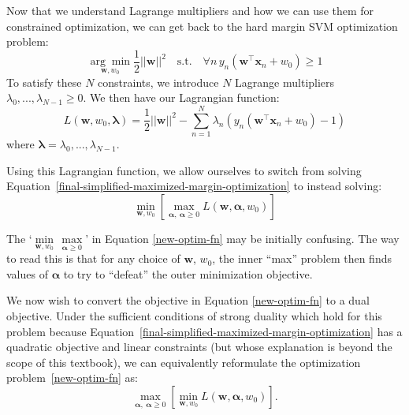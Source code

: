 Now that we understand Lagrange multipliers and how we can use them for constrained optimization, we can get back to the hard margin SVM optimization problem:
\begin{equation} \label{original-optim-fn}
	\underset{\textbf{w}, w_{0}}{\arg\min} \frac{1}{2} ||\textbf{w}||^{2} \quad \text{s.t.} \quad \forall n \, y_{n}(\textbf{w}^\top\textbf{x}_{n} + w_{0}) \geq 1
\end{equation}
To satisfy these $N$ constraints, we introduce $N$ Lagrange multipliers $\lambda_{0}, ..., \lambda_{N-1} \geq 0$. We then have our Lagrangian function:
\begin{equation} \label{lagrange-equation}
	L(\textbf{w}, w_{0}, \boldsymbol{\lambda}) = \frac{1}{2} ||\textbf{w}||^{2} - \sum_{n=1}^{N} \lambda_{n} (y_{n}(\textbf{w}^\top \textbf{x}_{n} + w_{0}) - 1)
\end{equation}
where $\boldsymbol{\lambda} = \lambda_{0}, ..., \lambda_{N-1}$.

\fi

Using this Lagrangian function, we allow ourselves to switch from solving Equation~\ref{final-simplified-maximized-margin-optimization} to instead solving:
%
\begin{equation} \label{new-optim-fn}
	\underset{\textbf{w}, w_{0}}{\min}\left[ \max_{\boldsymbol{\alpha} , \ \boldsymbol{\alpha} \geq 0} L(\textbf{w},  \boldsymbol{\alpha},w_0)\right]
\end{equation}

\begin{warning}
    The `$\underset{\textbf{w}, w_{0}}{\min} \, \underset{\boldsymbol{\alpha} \geq 0}{\max}$' in Equation \ref{new-optim-fn} may be initially confusing. The way to read this is that for any choice of $\mathbf w$, $w_0$, the inner ``max'' problem then finds values of $\boldsymbol{\alpha}$ to try to ``defeat'' the outer minimization objective.
\end{warning}

We now wish to convert the objective in Equation \ref{new-optim-fn} to a dual objective. Under the sufficient conditions of strong duality which hold for this problem because Equation~\ref{final-simplified-maximized-margin-optimization} has a quadratic objective and linear constraints (but whose explanation is beyond the scope of this textbook), we can equivalently reformulate the optimization problem~\eqref{new-optim-fn} as:
%
%
\begin{equation} \label{dual-objective}
	\max_{\boldsymbol{\alpha}, \ \boldsymbol{\alpha} \geq 0} \left[\underset{\textbf{w}, w_{0}}{\min} L(\textbf{w},  \boldsymbol{\alpha},w_0)\right].
      \end{equation}
      
